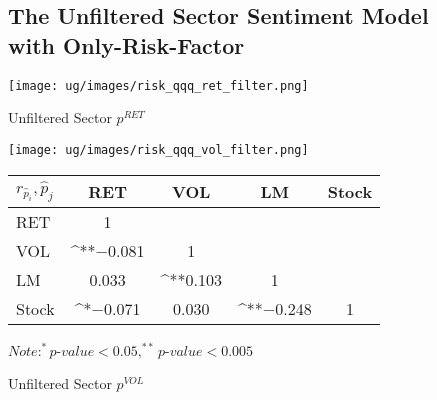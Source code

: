 \documentclass[logo,bsc,singlespacing,parskip]{infthesis}
\begin{document}
\begin{figure}[ht]
\subsection{The Unfiltered Sector Sentiment Model with Only-Risk-Factor}
\label{appendix_risk_qqq}
  \centering
  \begin{minipage}{0.5\textwidth}
    \centering
    \texttt{[image: ug/images/risk\_qqq\_ret\_filter.png]}
    \caption{\small Unfiltered Sector ${p}^{RET}$}
    \label{fig:risk_qqq_ret_unfiltered}
  \end{minipage}%
  \begin{minipage}{0.5\textwidth}
    \centering
    \texttt{[image: ug/images/risk\_qqq\_vol\_filter.png]} 
    \caption{\small Unfiltered Sector ${p}^{VOL}$}
    \label{fig:risk_qqq_vol_unfiltered}
  \end{minipage}


    \begin{minipage}[t]{0.9\textwidth}
    \centering
    \begin{tabular}{lcccc}
    \label{tab:risk_qqq_corr_unfiltered}
    $r_\hat{p}_i,\hat{p}_j$     & RET       & VOL       & LM        & Stock    \\ \hline
    RET    & 1  &   &  &  \\
    VOL    & ^{**}$-$0.081   & 1  &  &  \\
    LM    & 0.033  & ^{**}0.103 & 1  &  \\
    Stock  & ^{*}$-$0.071 & 0.030  & ^{**}$-$0.248 & 1  \\ \hline
    \end{tabular}
    \medskip
    $\textit{Note}: ^{*}p$-$value<0.05, ^{**}p$-$value<0.005$
    \end{minipage}

\end{figure}
\end{document}
